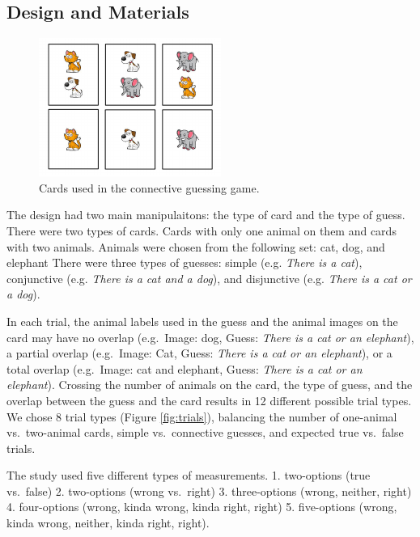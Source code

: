 \documentclass[floatsintext,man]{apa6}
\theoremstyle{definition}
\theoremstyle{definition}
\theoremstyle{definition}
\theoremstyle{remark}
\begin{document}
\subsection{Design and Materials}\label{design-and-materials}

\begin{figure}[t]

{\centering \includegraphics{writeup_files/figure-latex/stimuli-1} 

}

\caption{Cards used in the connective guessing game.}\label{fig:stimuli}
\end{figure}

The design had two main manipulaitons: the type of card and the type of
guess. There were two types of cards. Cards with only one animal on them
and cards with two animals. Animals were chosen from the following set:
cat, dog, and elephant There were three types of guesses: simple (e.g.
\emph{There is a cat}), conjunctive (e.g. \emph{There is a cat and a
dog}), and disjunctive (e.g. \emph{There is a cat or a dog}).

In each trial, the animal labels used in the guess and the animal images
on the card may have no overlap (e.g.~Image: dog, Guess: \emph{There is
a cat or an elephant}), a partial overlap (e.g.~Image: Cat, Guess:
\emph{There is a cat or an elephant}), or a total overlap (e.g.~Image:
cat and elephant, Guess: \emph{There is a cat or an elephant}). Crossing
the number of animals on the card, the type of guess, and the overlap
between the guess and the card results in 12 different possible trial
types. We chose 8 trial types (Figure \ref{fig:trials}), balancing the
number of one-animal vs.~two-animal cards, simple vs.~connective
guesses, and expected true vs.~false trials.

The study used five different types of measurements. 1. two-options
(true vs.~false) 2. two-options (wrong vs.~right) 3. three-options
(wrong, neither, right) 4. four-options (wrong, kinda wrong, kinda
right, right) 5. five-options (wrong, kinda wrong, neither, kinda right,
right).
\end{document}

